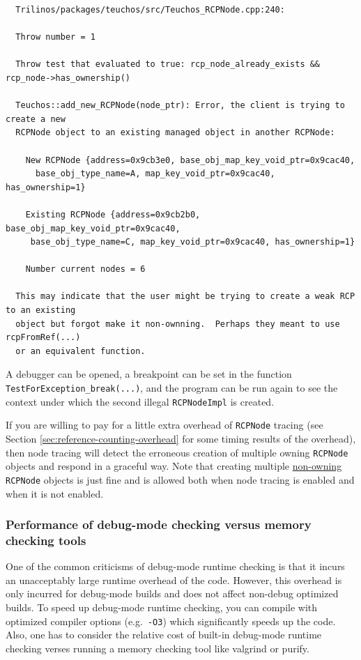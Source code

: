 \documentclass[pdf,ps2pdf,11pt]{SANDreport}
\begin{document}
{\small\begin{verbatim}
  Trilinos/packages/teuchos/src/Teuchos_RCPNode.cpp:240:
  
  Throw number = 1
  
  Throw test that evaluated to true: rcp_node_already_exists && rcp_node->has_ownership()
  
  Teuchos::add_new_RCPNode(node_ptr): Error, the client is trying to create a new
  RCPNode object to an existing managed object in another RCPNode:
  
    New RCPNode {address=0x9cb3e0, base_obj_map_key_void_ptr=0x9cac40,
      base_obj_type_name=A, map_key_void_ptr=0x9cac40, has_ownership=1}
  
    Existing RCPNode {address=0x9cb2b0, base_obj_map_key_void_ptr=0x9cac40,
     base_obj_type_name=C, map_key_void_ptr=0x9cac40, has_ownership=1}
  
    Number current nodes = 6
  
  This may indicate that the user might be trying to create a weak RCP to an existing
  object but forgot make it non-ownning.  Perhaps they meant to use rcpFromRef(...)
  or an equivalent function.
\end{verbatim}}

A debugger can be opened, a breakpoint can be set in the function
{}\texttt{TestForException\_break(...)}, and the program can be run
again to see the context under which the second illegal
{}\texttt{RCPNodeImpl} is created.

If you are willing to pay for a little extra overhead of
{}\texttt{RCPNode} tracing (see Section
{}\ref{sec:reference-counting-overhead} for some timing results of the
overhead), then node tracing will detect the erroneous creation of
multiple owning {}\texttt{RCPNode} objects and respond in a graceful
way.  Note that creating multiple {}\underline{non-owning}
{}\texttt{RCPNode} objects is just fine and is allowed both when node
tracing is enabled and when it is not enabled.


%
{}\subsubsection{Performance of debug-mode checking versus memory
checking tools}
%

One of the common criticisms of debug-mode runtime checking is that it
incurs an unacceptably large runtime overhead of the code.  However,
this overhead is only incurred for debug-mode builds and does not
affect non-debug optimized builds.  To speed up debug-mode runtime
checking, you can compile with optimized compiler options (e.g.\
{}\texttt{-O3}) which significantly speeds up the code.  Also, one has
to consider the relative cost of built-in debug-mode runtime checking
verses running a memory checking tool like valgrind or purify.
\end{document}

